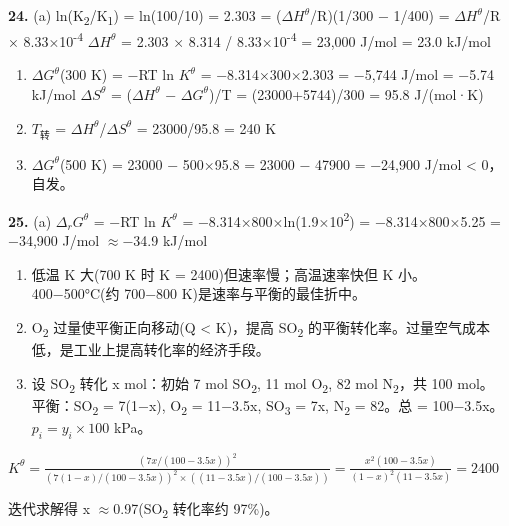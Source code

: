 \documentclass[a4paper,11pt]{ctexart}
\newcommand{\箭}{\ensuremath{\rightarrow}}
\newcommand{\左箭}{\ensuremath{\leftarrow}}
\newcommand{\上箭}{\ensuremath{\uparrow}}
\newcommand{\下箭}{\ensuremath{\downarrow}}
\newcommand{\衡}{\ensuremath{\rightleftharpoons}}
\newcommand{\双箭}{\ensuremath{\leftrightarrow}}
\newcommand{\约等于}{\ensuremath{\approx}}
\newcommand{\小于等于}{\ensuremath{\leq}}
\newcommand{\大于等于}{\ensuremath{\geq}}
\newcommand{\不等于}{\ensuremath{\neq}}
\newcommand{\西格马}{\ensuremath{\sigma}}
\newcommand{\派}{\ensuremath{\pi}}
\begin{document}
\textbf{24.}
(a) ln(K\textsubscript{2}/K\textsubscript{1}) = ln(100/10) = 2.303 = (\(\Delta H^\theta\)/R)(1/300 − 1/400) = \(\Delta H^\theta\)/R × 8.33×10\textsuperscript{-4}
\(\Delta H^\theta\) = 2.303 × 8.314 / 8.33×10\textsuperscript{-4} = 23,000 J/mol = 23.0 kJ/mol

\begin{enumerate}
\def\labelenumi{(\alph{enumi})}
\setcounter{enumi}{1}
\item
  \(\Delta G^\theta\)(300 K) = −RT ln \(K^\theta\) = −8.314×300×2.303 = −5,744 J/mol = −5.74 kJ/mol
  \(\Delta S^\theta\) = (\(\Delta H^\theta\) − \(\Delta G^\theta\))/T = (23000+5744)/300 = 95.8 J/(mol·K)
\item
  \(T_{转}\) = \(\Delta H^\theta\)/\(\Delta S^\theta\) = 23000/95.8 = 240 K
\item
  \(\Delta G^\theta\)(500 K) = 23000 − 500×95.8 = 23000 − 47900 = −24,900 J/mol \textless{} 0，自发。
\end{enumerate}

\textbf{25.}
(a) \(\Delta_r G^\theta\) = −RT ln \(K^\theta\) = −8.314×800×ln(1.9×10\textsuperscript{2}) = −8.314×800×5.25 = −34,900 J/mol \约等于 −34.9 kJ/mol

\begin{enumerate}
\def\labelenumi{(\alph{enumi})}
\setcounter{enumi}{1}
\item
  低温 K 大(700 K 时 K = 2400)但速率慢；高温速率快但 K 小。400−500°C(约 700−800 K)是速率与平衡的最佳折中。
\item
  O\textsubscript{2} 过量使平衡正向移动(Q \textless{} K)，提高 SO\textsubscript{2} 的平衡转化率。过量空气成本低，是工业上提高转化率的经济手段。
\item
  设 SO\textsubscript{2} 转化 x mol：初始 7 mol SO\textsubscript{2}, 11 mol O\textsubscript{2}, 82 mol N\textsubscript{2}，共 100 mol。
  平衡：SO\textsubscript{2} = 7(1−x), O\textsubscript{2} = 11−3.5x, SO\textsubscript{3} = 7x, N\textsubscript{2} = 82。总 = 100−3.5x。
  \(p_i = y_i \times 100\) kPa。
\end{enumerate}

\(K^\theta = \frac{(7x/(100-3.5x))^2}{(7(1-x)/(100-3.5x))^2 \times ((11-3.5x)/(100-3.5x))} = \frac{x^2(100-3.5x)}{(1-x)^2(11-3.5x)} = 2400\)

迭代求解得 x \约等于 0.97(SO\textsubscript{2} 转化率约 97\%)。
\end{document}
